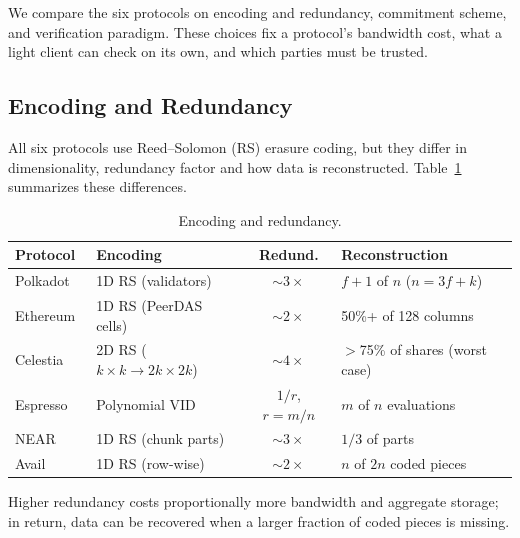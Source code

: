 
We compare the six protocols on encoding and redundancy, commitment scheme, and verification paradigm.
These choices fix a protocol's bandwidth cost, what a light client can check on its own, and which parties must be trusted.

\subsection{Encoding and Redundancy}
\label{subsec:encoding}

All six protocols use Reed--Solomon (RS) erasure coding, but they differ in dimensionality, redundancy factor and how data is reconstructed.
Table~\ref{tab:encoding_comparison} summarizes these differences.

\begin{table}[t]
\centering
\caption{Encoding and redundancy.}
\label{tab:encoding_comparison}
\setlength{\tabcolsep}{2pt}
\footnotesize
\begin{tabular}{l l c l}
\toprule
\textbf{Protocol} & \textbf{Encoding} & \textbf{Redund.} & \textbf{Reconstruction} \\
\midrule
Polkadot~\cite{Jeff_Burdges_ELVES} & 1D RS (validators) & ${\sim}3\times$ & $f{+}1$ of $n$ ($n{=}3f{+}k$) \\
Ethereum~\cite{EIP-7594} & 1D RS (PeerDAS cells) & ${\sim}2\times$ & 50\%+ of 128 columns \\
Celestia~\cite{AlBassam_LazyLedger} & 2D RS ($k \times k \to 2k \times 2k$) & ${\sim}4\times$ & $>$75\% of shares (worst case) \\
Espresso~\cite{Espresso:Hotshot_and_Triamisu} & Polynomial VID & $1/r$, $r{=}m/n$ & $m$ of $n$ evaluations \\
NEAR~\cite{NEAR_Nightshade_Scaling_Blockchain} & 1D RS (chunk parts) & ${\sim}3\times$ & $1/3$ of parts \\
Avail~\cite{Avail_The_DA_Blockchain} & 1D RS (row-wise) & ${\sim}2\times$ & $n$ of $2n$ coded pieces \\
\bottomrule
\end{tabular}
\end{table}

Higher redundancy costs proportionally more bandwidth and aggregate storage; in return, data can be recovered when a larger fraction of coded pieces is missing.


